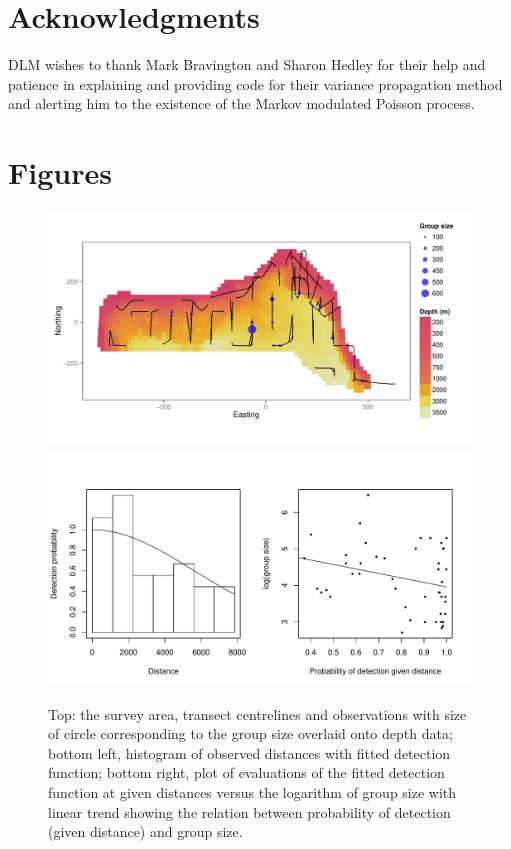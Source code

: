 \documentclass[a4paper,12pt]{article}
\begin{document}
\section*{Acknowledgments}

DLM wishes to thank Mark Bravington and Sharon Hedley for their help and patience in explaining and providing code for their variance propagation method and alerting him to the existence of the Markov modulated Poisson process.



\newpage



\newpage


\newpage


\section*{Figures}

\begin{figure}[h!]
  \caption{Top: the survey area, transect centrelines and observations with size of circle corresponding to the group size overlaid onto depth data; bottom left, histogram of observed distances with fitted detection function; bottom right, plot of evaluations of the fitted detection function at given distances versus the logarithm of group size with linear trend showing the relation between probability of detection (given distance) and group size.}
  \label{dolphin-eda}
  \begin{center}
    \includegraphics[width=\textwidth]{figs/depth-transects}\\
        \includegraphics[width=\textwidth]{figs/distances-groups}
  \end{center}
\end{figure}
\end{document}
